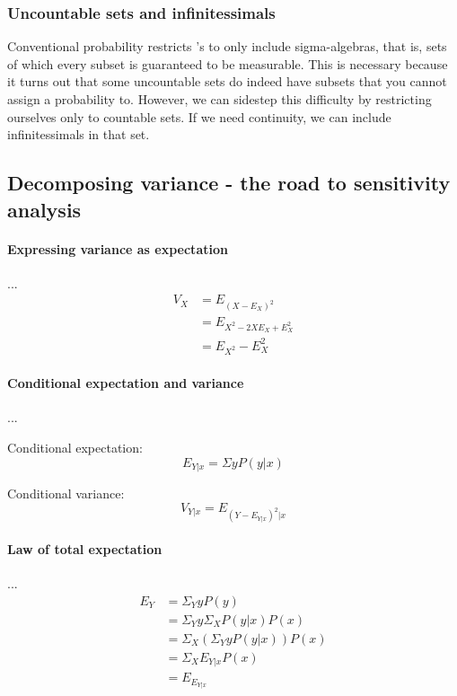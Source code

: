 \subsubsection{Uncountable sets and infinitessimals}

Conventional probability restricts \samplespace 's to only include sigma-algebras, that is, sets of which every subset is guaranteed to be measurable. This is necessary because it turns out that some uncountable sets do indeed have subsets that you cannot assign a probability to. However, we can sidestep this difficulty by restricting ourselves only to countable sets. If we need continuity, we can include infinitessimals in that set.

 
 


\subsection{Decomposing variance - the road to sensitivity analysis}

\paragraph{Expressing variance as expectation} ...
\begin{equation}
    \begin{aligned}
        V_X &= E_{ (X - E_X)^2 } \\
            &= E_{ X^2 - 2 X E_X + E_X^2 } \\
            &= E_{X^2} - E_X^2
    \end{aligned}
\end{equation}

\paragraph{Conditional expectation and variance} ...

\begin{definition} \label{conditionalExpectation}
    Conditional expectation:
    $$ E_{Y|x} = \Sigma y P(y|x) $$
\end{definition}

\begin{definition} \label{conditionalVariance}
    Conditional variance: 
    $$ V_{Y|x} = E_{(Y - E_{Y|x})^2 | x} $$ 
\end{definition}

\paragraph{Law of total expectation} ...
\begin{equation} \label{lawOfTotalExpectation}
    \begin{aligned}
        E_Y &= \Sigma_Y y P(y) \\
            &= \Sigma_Y y \Sigma_X P(y|x) P(x) \\
            &= \Sigma_X (\Sigma_Y y P(y|x)) P(x) \\
            &= \Sigma_X E_{Y|x} P(x) \\
            &= E_{E_{Y|x}}
    \end{aligned}
\end{equation}


